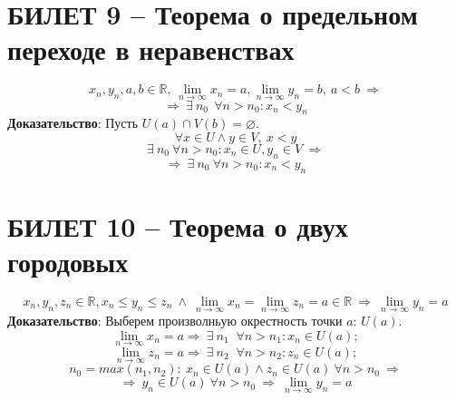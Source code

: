 \documentclass{article}
\newcommand{\R}{\mathbb R}
\begin{document}
\section{БИЛЕТ 9 -- Теорема о предельном переходе в неравенствах}
$$ x_{n},y_{n},a,b\in\R,\, \lim_{n\to\infty} x_{n}=a,\lim_{n\to\infty} y_{n}=b,\: a<b\:\Rightarrow  $$
$$ \Rightarrow\:\exists\:n_{0}\:\:\forall n>n_{0}:x_{n}<y_{n} $$
\textbf{Доказательство}:
\newline
\newline
Пусть $U(a)\cap V(b)=\varnothing$.
$$\forall x\in U \land y\in V,\: x<y$$
$$\exists \:n_{0}\:\forall n>n_{0}:x_{n}\in U,y_{n}\in V\:\Rightarrow$$
$$\Rightarrow\:\exists\:n_{0}\:\forall n>n_{0}:x_{n}<y_{n}$$
\newpage
\section{БИЛЕТ 10 -- Теорема о двух городовых}
$$x_{n},y_{n},z_{n}\in\R,x_{n}\leqslant y_{n}\leqslant z_{n} \:\land \:\lim_{n\to\infty} x_{n}=\lim_{n\to\infty} z_{n}=a\in\R \:\Rightarrow\:\lim_{n\to\infty}y_{n}=a$$
\textbf{Доказательство}:
\newline
\newline
Выберем произволньую окрестность точки $a$: $U(a)$.
$$\lim_{n\to\infty} x_{n}=a \Rightarrow \: \exists \: n_{1} \;\; \forall n>n_{1} : x_{n}\in U(a);$$
$$\lim_{n\to\infty} z_{n}=a \Rightarrow \: \exists \: n_{2} \;\; \forall n>n_{2} : z_{n}\in U(a);$$
$$ n_{0}=max(n_{1},n_{2}):\:x_{n}\in U(a)\land z_{n}\in U(a) \:\forall n>n_{0}\:\Rightarrow $$
$$ \Rightarrow\:y_{n}\in U(a)\:\forall n>n_{0}\:\Rightarrow\: \lim_{n\to\infty} y_{n}=a$$
\newpage
\end{document}
